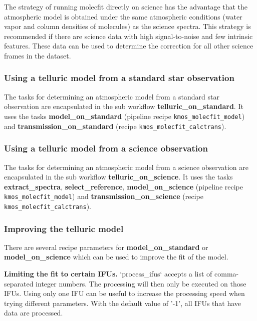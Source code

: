 The strategy of running molecfit directly on science has the advantage that the atmospheric model is obtained
under the same atmospheric conditions (water vapor and column densities of molecules) as the science spectra.
This strategy is recommended if there are science data with high signal-to-noise and few intrinsic features. These
data can be used to determine the correction for all other science frames in the dataset.


\subsubsection{Using a telluric model from a standard star observation}
\label{sec:telluric_standard}

The tasks for determining an atmospheric model from a standard star observation
are encapsulated in the sub workflow \textbf{telluric\_on\_standard}. It uses the tasks \textbf{model\_on\_standard}
(pipeline recipe {\tt kmos\_molecfit\_model}) and \textbf{transmission\_on\_standard}
(recipe {\tt kmos\_molecfit\_calctrans}).


\subsubsection{Using a telluric model from a science observation}
\label{sec:telluric_science}

The tasks for determining an atmospheric model from a science observation
are encapsulated in the sub workflow \textbf{telluric\_on\_science}.
It uses the tasks \textbf{extract\_spectra}, \textbf{select\_reference},
\textbf{model\_on\_science} (pipeline recipe {\tt kmos\_molecfit\_model})
and \textbf{transmission\_on\_science} (recipe {\tt kmos\_molecfit\_calctrans}).



\subsubsection{Improving the telluric model}
\label{sec:improve_telluric_model}

There are several recipe parameters for \textbf{model\_on\_standard} or \textbf{model\_on\_science}
which can be used to improve the fit of the model.

\textbf{Limiting the fit to certain IFUs.} `process\_ifus` accepts a list of comma-separated integer numbers.
The processing will then only be executed on those IFUs. Using only one IFU can be useful to increase the
processing speed when trying different parameters. With the default value of '-1', all IFUs that have data are
processed.

